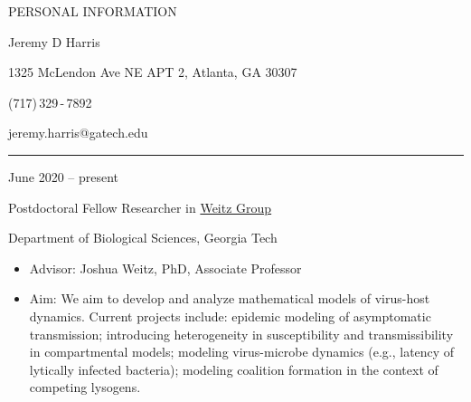 \documentclass[a4paper,10pt]{article}
\newlength{\cvcolumngapwidth}
\newlength{\cvleftcolumnwidth}
\newlength{\cvrightcolumnwidth}
\newcommand{\cvnamestyle}[1]{{\Large\cvnamefont\textcolor{cvnamecolor}{#1}}}
\newcommand{\cvsectionstyle}[1]{{\normalsize\cvsectionfont\textcolor{cvsectioncolor}{#1}}}
\newcommand{\cvtitlestyle}[1]{{\large\cvtitlefont\textcolor{cvtitlecolor}{#1}}}
\newcommand{\cvdurationstyle}[1]{{\small\cvdurationfont\textcolor{cvdurationcolor}{#1}}}
\newlength{\cvafteritemskipamount}
\newlength{\cvaftersectionskipamount}
\newlength{\cvafternameskipamount}
\newlength{\cvafterpersonalinfolineskipamount}
\newlength{\cvaftertitleskipamount}
\newlength{\cvparskip}
\newcommand{\cvpersonalinfo}[2]{
            \begin{minipage}[t]{\cvleftcolumnwidth}
                \vspace{0mm} %
                \raggedleft #1
            \end{minipage}%
            \hspace{\cvcolumngapwidth}%
            \begin{minipage}[t]{\cvrightcolumnwidth}
                \vspace{0mm} %
                #2
            \end{minipage}
        
            \vspace{\cvafteritemskipamount}
        }
\newcommand{\cvname}[1]{
            \cvnamestyle{#1}
        
            \vspace{\cvafternameskipamount}
        }
\newcommand{\cvpersonalinfolinewithicon}[3]{
            \raisebox{.5\fontcharht\font`E-.5\height}{\texttt{[image: \#2]}}
            #3
        
            \vspace{\cvafterpersonalinfolineskipamount}
        }
\newcommand{\cvsection}[1]{
            \begin{minipage}[t]{\cvleftcolumnwidth}
                \raggedleft\cvsectionstyle{#1}
            \end{minipage}%
            \hspace{\cvcolumngapwidth}%
            \begin{minipage}[t]{\cvrightcolumnwidth}
                \textcolor{cvrulecolor}{\rule{\cvrightcolumnwidth}{0.3mm}}
            \end{minipage}
        
            \vspace{\cvaftersectionskipamount}
        }
\newcommand{\cvitem}[2]{
            \begin{minipage}[t]{\cvleftcolumnwidth}
                \raggedleft #1
            \end{minipage}%
            \hspace{\cvcolumngapwidth}%
            \begin{minipage}[t]{\cvrightcolumnwidth}
                \setlength{\parskip}{\cvparskip} #2
            \end{minipage}
        
            \vspace{\cvafteritemskipamount}
        }
\newcommand{\cvtitle}[1]{
            \cvtitlestyle{#1}
        
            \vspace{\cvaftertitleskipamount}
            \vspace{-\cvparskip}
        }
\begin{document}
        
        
        
        \cvpersonalinfo{
            \cvsectionstyle{PERSONAL INFORMATION}
        }{
            \cvname{Jeremy D Harris}
        
            \cvpersonalinfolinewithicon{height=4mm}{resources/europasscv-icons/address_europass_icon.pdf}{
        1325 McLendon Ave NE APT 2, Atlanta, GA 30307
            }
        
            \cvpersonalinfolinewithicon{height=4mm}{resources/europasscv-icons/mobile_europass_icon.pdf}{
                (717)\,329\,-\,7892
            }
        
            \cvpersonalinfolinewithicon{height=4mm}{resources/europasscv-icons/mail_europass_icon.pdf}{
                jeremy.harris@gatech.edu
            }
        
        
        }
        
        
        
        \cvsection{WORK EXPERIENCE}
        
        \cvitem{
            \cvdurationstyle{June 2020 -- present}
        }{
            \cvtitle{Postdoctoral Fellow Researcher in \href{https://weitzgroup.biosci.gatech.edu/}{Weitz Group}}
        
        	Department of Biological Sciences, Georgia Tech%
        
            \begin{itemize}[leftmargin=*]
            	\item Advisor: Joshua Weitz, PhD, Associate Professor
                \item Aim: We aim to develop and analyze mathematical models of virus-host dynamics. Current projects include: epidemic modeling of asymptomatic transmission; introducing heterogeneity in susceptibility and transmissibility in compartmental models; modeling virus-microbe dynamics (e.g., latency of lytically infected bacteria); modeling coalition formation in the context of competing lysogens.
        
            \end{itemize}
        }
        
\end{document}
